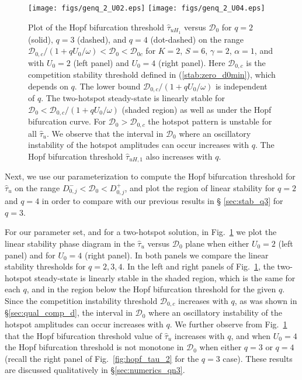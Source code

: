 \documentclass{article}%
\begin{document}
\begin{figure}[htbp]
\centering
\texttt{[image: figs/genq\_2\_U02.eps]}
\texttt{[image: figs/genq\_2\_U04.eps]}
\caption{\label{fig:genq::hopf_tau_2} Plot of the Hopf bifurcation
  threshold $\hat{\tau}_{uH_1}$ versus ${\mathcal D}_0$ for $q=2$
  (solid), $q=3$ (dashed), and $q=4$ (dot-dashed) on the range
  ${{\mathcal D}_{0,c}/(1+{qU_0/\omega})}<{\mathcal D}_0<{\mathcal
    D}_{0c}$ for $K=2$, $S=6$, $\gamma=2$, $\alpha=1$, and with
  $U_0=2$ (left panel) and $U_0=4$ (right panel). Here ${\mathcal
    D}_{0,c}$ is the competition stability threshold defined in
  (\ref{stab:zero_d0min}), which depends on $q$. The lower bound
  ${{\mathcal D}_{0,c}/(1+{qU_0/\omega})}$ is independent of $q$. The
  two-hotspot steady-state is linearly stable for ${\mathcal
    D}_0<{{\mathcal D}_{0,c}/(1+{qU_0/\omega})}$ (shaded region) as
  well as under the Hopf bifurcation curve. For ${\mathcal
    D}_0>{\mathcal D}_{0,c}$ the hotspot pattern is unstable for all
  $\hat{\tau}_u$. We observe that the interval in ${\mathcal D}_0$
  where an oscillatory instability of the hotspot amplitudes can occur
  increases with $q$. The Hopf bifurcation threshold
  $\hat{\tau}_{uH,1}$ also increases with $q$.}
\end{figure}

Next, we use our parameterization to compute the Hopf bifurcation
threshold for $\hat{\tau}_u$ on the range $D^{-}_{0,j}<{\mathcal
  D}_0<D^{+}_{0,j}$, and plot the region of linear stability for $q=2$
and $q=4$ in order to compare with our previous results in \S
\ref{sec:stab_q3} for $q=3$.

For our parameter set, and for a two-hotspot solution, in
Fig.~\ref{fig:genq::hopf_tau_2} we plot the linear stability phase
diagram in the $\hat{\tau}_u$ versus ${\mathcal D}_0$ plane when
either $U_0=2$ (left panel) and for $U_0=4$ (right panel). In both
panels we compare the linear stability thresholds for $q=2,3,4$. In
the left and right panels of Fig.~\ref{fig:genq::hopf_tau_2}, the
two-hotspot steady-state is linearly stable in the shaded region,
which is the same for each $q$, and in the region below the Hopf
bifurcation threshold for the given $q$. Since the competition
instability threshold ${\mathcal D}_{0,c}$ increases with $q$, as was
shown in \S \ref{sec:qual_comp_d}, the interval in ${\mathcal D}_0$
where an oscillatory instability of the hotspot amplitudes can occur
increases with $q$. We further observe from
Fig.~\ref{fig:genq::hopf_tau_2} that the Hopf bifurcation threshold
value of $\hat{\tau}_u$ increases with $q$, and when $U_0=4$ the Hopf
bifurcation threshold is not monotone in ${\mathcal D}_0$ when either
$q=3$ or $q=4$ (recall the right panel of Fig.~\ref{fig:hopf_tau_2}
for the $q=3$ case). These results are discussed qualitatively in
\S \ref{sec:numerics_qn3}.
\end{document}
